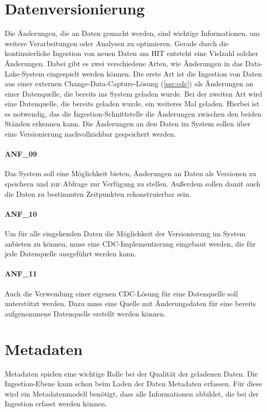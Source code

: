 \section{Datenversionierung}
\label{sec:anf-vers}
Die Änderungen, die an Daten gemacht werden, sind wichtige Informationen, um weitere Verarbeitungen oder Analysen zu optimieren.
Gerade durch die kontinuierliche Ingestion von neuen Daten am HIT entsteht eine Vielzahl solcher Änderungen.
Dabei gibt es zwei verschiedene Arten, wie Änderungen in das Data-Lake-System eingespielt werden können.
Die erste Art ist die Ingestion von Daten aus einer externen Change-Data-Capture-Lösung (\cref{sec:cdc}) als Änderungen an einer Datenquelle, die bereits ins System geladen wurde.
Bei der zweiten Art wird eine Datenquelle, die bereits geladen wurde, ein weiteres Mal geladen.
Hierbei ist es notwendig, das die Ingestion-Schnittstelle die Änderungen zwischen den beiden Ständen erkennen kann.
Die Änderungen an den Daten im System sollen über eine Versionierung nachvollziehbar gespeichert werden.

\paragraph{ANF\_09}
\label{ANF_09}
Das System soll eine Möglichkeit bieten, Änderungen an Daten als Versionen zu speichern und zur Abfrage zur Verfügung zu stellen.
Außerdem sollen damit auch die Daten zu bestimmten Zeitpunkten rekonstruierbar sein.

\paragraph{ANF\_10}
\label{ANF_10}
Um für alle eingehenden Daten die Möglichkeit der Versionierung im System anbieten zu können, muss eine CDC-Implementierung eingebaut werden, die für jede Datenquelle ausgeführt werden kann.

\paragraph{ANF\_11}
\label{ANF_11}
Auch die Verwendung einer eigenen CDC-Lösung für eine Datenquelle soll unterstützt werden.
Dazu muss eine Quelle mit Änderungsdaten für eine bereits aufgenommene Datenquelle erstellt werden können.

\section{Metadaten}
\label{sec:anf-metadata}
Metadaten spielen eine wichtige Rolle bei der Qualität der geladenen Daten.
Die Ingestion-Ebene kann schon beim Laden der Daten Metadaten erfassen.
Für diese wird ein Metadatenmodell benötigt, dass alle Informationen abbildet, die bei der Ingestion erfasst werden können.

